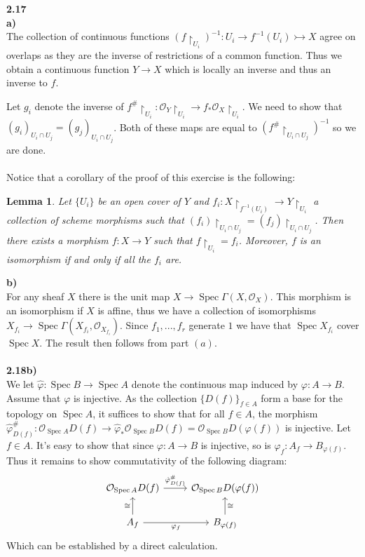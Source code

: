 \documentclass[12pt]{article}
\numberwithin{thm}{subsection}
\numberwithin{defn}{subsection}
\newtheorem{lemma}{Lemma}
\numberwithin{lemma}{subsection}
\numberwithin{example}{subsection}
\numberwithin{notation}{subsection}
\numberwithin{cor}{subsection}
\numberwithin{remark}{subsection}
\numberwithin{condition}{subsection}
\numberwithin{question}{subsection}
\numberwithin{construction}{subsection}
\numberwithin{construction}{subsection}
\numberwithin{construction}{subsection}
\newcommand{\call}[1]{\mathcal{#1}}
\newcommand{\lto}{\longrightarrow}
\begin{document}
%
\textbf{2.17}\\
\textbf{a)}\\
The collection of continuous functions $(f\restriction_{U_i})^{-1}: U_i \lto f^{-1}(U_i) \rightarrowtail X$ agree on overlaps as they are the inverse of restrictions of a common function. Thus we obtain a continuous function $Y \to X$ which is locally an inverse and thus an inverse to $f$.

Let $g_i$ denote the inverse of $f^{\#}\restriction_{U_i}: \call{O}_Y\restriction_{U_i} \lto f_\ast\call{O}_X\restriction_{U_i}$. We need to show that $(g_i)_{U_i \cap U_j} = (g_j)_{U_i \cap U_j}$. Both of these maps are equal to $(f^{\#}\restriction_{U_i \cap U_j})^{-1}$ so we are done.\\\\
%
Notice that a corollary of the proof of this exercise is the following:
\begin{lemma}
Let $\lbrace U_i \rbrace$ be an open cover of $Y$ and $f_i: X\restriction_{f^{-1}(U_i)} \to Y\restriction_{U_i}$ a collection of scheme morphisms such that $(f_i)\restriction_{U_i \cap U_j} = (f_j)\restriction_{U_i \cap U_j}$. Then there exists a morphism $f: X \to Y$ such that $f\restriction_{U_i} = f_i$. Moreover, $f$ is an isomorphism if and only if all the $f_i$ are.
\end{lemma}
\textbf{b)}\\
For any sheaf $X$ there is the unit map $X \lto \operatorname{Spec}\Gamma(X,\call{O}_X)$. This morphism is an isomorphism if $X$ is affine, thus we have a collection of isomorphisms $X_{f_i} \lto \operatorname{Spec}\Gamma(X_{f_i},\call{O}_{X_{f_i}})$. Since $f_1,...,f_r$ generate $1$ we have that $\operatorname{Spec}X_{f_i}$ cover $\operatorname{Spec}X$. The result then follows from part $(a)$.
\\\\
\textbf{2.18b)}\\
We let $\hat{\varphi}: \operatorname{Spec}B \lto \operatorname{Spec}A$ denote the continuous map induced by $\varphi:A \lto B$. Assume that $\varphi$ is injective. As the collection $\lbrace D(f)\rbrace_{f \in A}$ form a base for the topology on $\operatorname{Spec}A$, it suffices to show that for all $f\in A$, the morphism $\hat{\varphi}^{\#}_{D(f)}: \call{O}_{\operatorname{Spec}A}D(f) \lto \hat{\varphi}_\ast\call{O}_{\operatorname{Spec}B}D(f) = \call{O}_{\operatorname{Spec}B}D(\varphi(f))$ is injective. Let $f\in A$. It's easy to show that since $\varphi:A \lto B$ is injective, so is $\varphi_f: A_f \lto B_{\varphi(f)}$. Thus it remains to show commutativity of the following diagram:
\[
\begin{tikzcd}
\call{O}_{\operatorname{Spec}A}D(f)\arrow[r,"{\hat{\varphi}^{\#}_{D(f)}}"] & \call{O}_{\operatorname{Spec}B}D(\varphi(f))\\
A_f\arrow[r,swap,"{\varphi_f}"]\arrow[u,"{\cong}"] & B_{\varphi(f)}\arrow[u,swap,"{\cong}"]
\end{tikzcd}
\]
Which can be established by a direct calculation.
%
\end{document}
